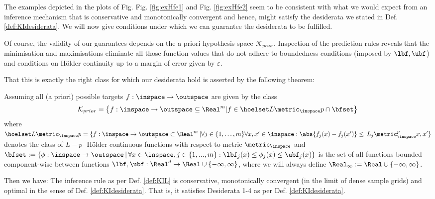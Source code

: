 The examples depicted in the plots of Fig. Fig. \ref{fig:exHfe1} and Fig. \ref{fig:exHfe2} seem to be consistent with what we would expect from an inference mechanism that is conservative and monotonically convergent and hence, might satisfy the desiderata we stated in Def. \ref{def:KIdesiderata}.
We will now give conditions under which we can guarantee the desiderata to be fulfilled. 

Of course, the validity of our guarantees depends on the a priori hypothesis space $\mathcal K_{prior}$. Inspection of the prediction rules reveals that the minimisation and maximisations eliminate all those function values that do not adhere to boundedness conditions (imposed by $\lbf,\ubf$) and conditions on H\"older continuity up to a margin of error given by $\varepsilon$. 

That this is exactly the right class for which our desiderata hold is asserted by the following theorem:

\begin{thm}
Assuming all (a priori) possible targets $f: \inspace \to \outspace$ are given by the class   
\begin{equation}
	\mathcal K_{prior}= \bigl\{ f : \inspace \to \outspace \subseteq \Real^m |  f \in \hoelset L {\metric_{\inspace}} p \cap \bfset \bigr\}
\end{equation}
where $\hoelset L {\metric_\inspace} p =\{ f: \inspace \to \outspace \subset \Real^m \, |  \forall j \in \{1,\ldots,m\} \forall x,x' \in \inspace: \abs{f_j(x) - f_j(x')}  \leq \, L_j \metric^p_{\inspace}{x,x'} \}$ denotes the class of $L-p$- H\"older continuous functions with respect to metric $\metric_\inspace$ and $\bfset :=\{\phi : \inspace \to \outspace \, | \, \forall x \in \inspace, j \in\{1,...,m\}: \lbf_j(x) \leq \phi_j(x) \leq \ubf_j(x)\} $
is the set of all functions bounded component-wise between functions $\lbf,\ubf: \Real^d \to \Real \cup \{- \infty, \infty\}$, where we will always define $\Real_\infty := \Real \cup\{- \infty, \infty\}$. 

Then we have:
The inference rule as per Def. \ref{def:KIL} is conservative, monotonically convergent (in the limit of dense sample grids) and optimal in the sense of Def. \ref{def:KIdesiderata}. That is, it satisfies Desiderata 1-4 as per Def. \ref{def:KIdesiderata}. 
\end{thm}


